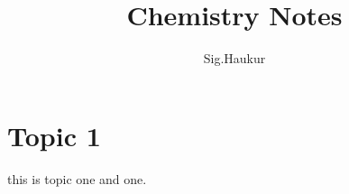 \documentclass[a4paper, 11pt]{article}
\author{Sig.Haukur}
\title{Chemistry Notes}
\begin{document}
\maketitle

\tableofcontents
 
\section{Topic 1}
this is topic one and one.
\end{document}
